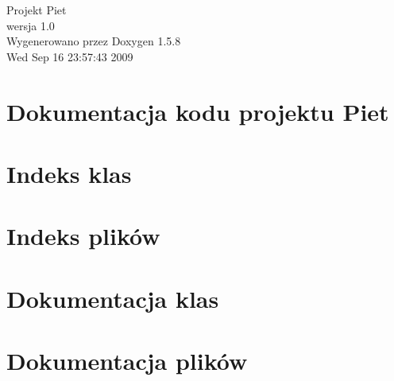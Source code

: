 \documentclass[a4paper]{book}
\begin{document}
\begin{titlepage}
\vspace*{7cm}
\begin{center}
{\Large Projekt Piet \\[1ex]\large wersja 1.0 }\\
\vspace*{1cm}
{\large Wygenerowano przez Doxygen 1.5.8}\\
\vspace*{0.5cm}
{\small Wed Sep 16 23:57:43 2009}\\
\end{center}
\end{titlepage}
\clearemptydoublepage
{}
\tableofcontents
\clearemptydoublepage
{}
\chapter{Dokumentacja kodu projektu Piet}
\label{index}\hypertarget{index}{}
\chapter{Indeks klas}

\chapter{Indeks plików}

\chapter{Dokumentacja klas}






\chapter{Dokumentacja plików}
















\printindex
\end{document}
